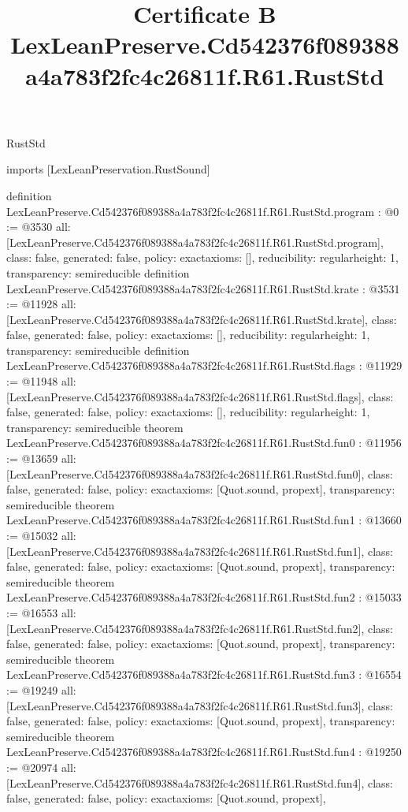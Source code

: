 \begin{lexlean}{RustStd}
\title{Certificate B LexLeanPreserve.Cd542376f089388a4a783f2fc4c26811f.R61.RustStd}
\begin{coremodule}
imports [LexLeanPreservation.RustSound]

definition LexLeanPreserve.Cd542376f089388a4a783f2fc4c26811f.R61.RustStd.program : @0 := @3530 {
  all: [LexLeanPreserve.Cd542376f089388a4a783f2fc4c26811f.R61.RustStd.program],
  class: false,
  generated: false,
  policy: exact{axioms: []},
  reducibility: regular{height: 1},
  transparency: semireducible
}
definition LexLeanPreserve.Cd542376f089388a4a783f2fc4c26811f.R61.RustStd.krate : @3531 := @11928 {
  all: [LexLeanPreserve.Cd542376f089388a4a783f2fc4c26811f.R61.RustStd.krate],
  class: false,
  generated: false,
  policy: exact{axioms: []},
  reducibility: regular{height: 1},
  transparency: semireducible
}
definition LexLeanPreserve.Cd542376f089388a4a783f2fc4c26811f.R61.RustStd.flags : @11929 := @11948 {
  all: [LexLeanPreserve.Cd542376f089388a4a783f2fc4c26811f.R61.RustStd.flags],
  class: false,
  generated: false,
  policy: exact{axioms: []},
  reducibility: regular{height: 1},
  transparency: semireducible
}
theorem LexLeanPreserve.Cd542376f089388a4a783f2fc4c26811f.R61.RustStd.fun0 : @11956 := @13659 {
  all: [LexLeanPreserve.Cd542376f089388a4a783f2fc4c26811f.R61.RustStd.fun0],
  class: false,
  generated: false,
  policy: exact{axioms: [Quot.sound, propext]},
  transparency: semireducible
}
theorem LexLeanPreserve.Cd542376f089388a4a783f2fc4c26811f.R61.RustStd.fun1 : @13660 := @15032 {
  all: [LexLeanPreserve.Cd542376f089388a4a783f2fc4c26811f.R61.RustStd.fun1],
  class: false,
  generated: false,
  policy: exact{axioms: [Quot.sound, propext]},
  transparency: semireducible
}
theorem LexLeanPreserve.Cd542376f089388a4a783f2fc4c26811f.R61.RustStd.fun2 : @15033 := @16553 {
  all: [LexLeanPreserve.Cd542376f089388a4a783f2fc4c26811f.R61.RustStd.fun2],
  class: false,
  generated: false,
  policy: exact{axioms: [Quot.sound, propext]},
  transparency: semireducible
}
theorem LexLeanPreserve.Cd542376f089388a4a783f2fc4c26811f.R61.RustStd.fun3 : @16554 := @19249 {
  all: [LexLeanPreserve.Cd542376f089388a4a783f2fc4c26811f.R61.RustStd.fun3],
  class: false,
  generated: false,
  policy: exact{axioms: [Quot.sound, propext]},
  transparency: semireducible
}
theorem LexLeanPreserve.Cd542376f089388a4a783f2fc4c26811f.R61.RustStd.fun4 : @19250 := @20974 {
  all: [LexLeanPreserve.Cd542376f089388a4a783f2fc4c26811f.R61.RustStd.fun4],
  class: false,
  generated: false,
  policy: exact{axioms: [Quot.sound, propext]},
}
\end{coremodule}
\end{lexlean}
